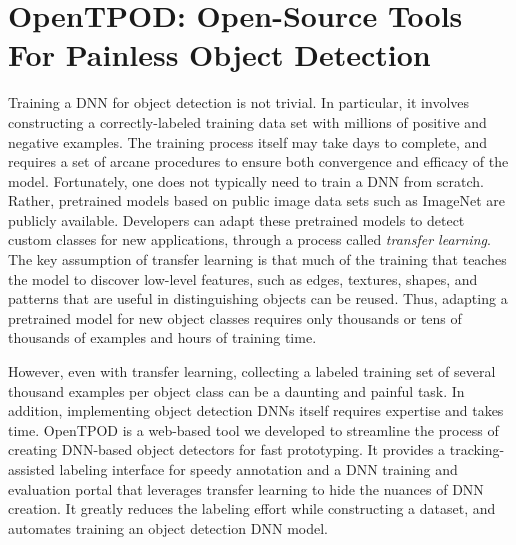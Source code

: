 \section{OpenTPOD: Open-Source Tools For Painless Object Detection}
\label{sec: app-dev-tpod}

Training a DNN for object detection is not trivial.  In particular, it involves
constructing a correctly-labeled training data set with millions of positive and
negative examples. The training process itself may take days to complete, and
requires a set of arcane procedures to ensure both convergence and efficacy of
the model. Fortunately, one does not typically need to train a DNN from scratch.
Rather, pretrained models based on public image data sets such as ImageNet are
publicly available. Developers can adapt these pretrained models to detect
custom classes for new applications, through a process called \emph{transfer
learning}.  The key assumption of transfer learning is that much of the training
that teaches the model to discover low-level features, such as edges, textures,
shapes, and patterns that are useful in distinguishing objects can be reused.
Thus, adapting a pretrained model for new object classes requires only thousands
or tens of thousands of examples and hours of training time. 

However, even with transfer learning, collecting a labeled training set of
several thousand examples per object class can be a daunting and painful task.
In addition, implementing object detection DNNs itself requires expertise and
takes time. OpenTPOD is a web-based tool we developed to streamline the process of
creating DNN-based object detectors for fast prototyping. It provides a
tracking-assisted labeling interface for speedy annotation and a DNN training
and evaluation portal that leverages transfer learning to hide the nuances of
DNN creation. It greatly reduces the labeling effort while constructing a
dataset, and automates training an object detection DNN model.


